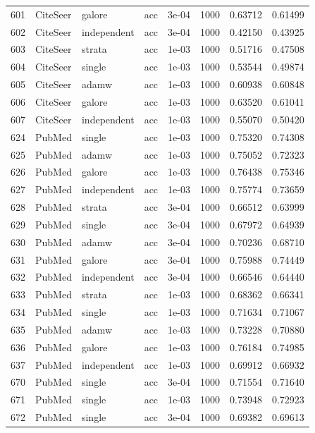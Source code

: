 \begin{longtable}{rlllrrrr}
601 & CiteSeer & galore & acc & 3e-04 & 1000 & 0.63712 & 0.61499 \\
602 & CiteSeer & independent & acc & 3e-04 & 1000 & 0.42150 & 0.43925 \\
\rowcolor{oursbg}
603 & CiteSeer & strata & acc & 1e-03 & 1000 & 0.51716 & 0.47508 \\
604 & CiteSeer & single & acc & 1e-03 & 1000 & 0.53544 & 0.49874 \\
605 & CiteSeer & adamw & acc & 1e-03 & 1000 & 0.60938 & 0.60848 \\
606 & CiteSeer & galore & acc & 1e-03 & 1000 & 0.63520 & 0.61041 \\
607 & CiteSeer & independent & acc & 1e-03 & 1000 & 0.55070 & 0.50420 \\
624 & PubMed & single & acc & 1e-03 & 1000 & 0.75320 & 0.74308 \\
625 & PubMed & adamw & acc & 1e-03 & 1000 & 0.75052 & 0.72323 \\
626 & PubMed & galore & acc & 1e-03 & 1000 & 0.76438 & 0.75346 \\
627 & PubMed & independent & acc & 1e-03 & 1000 & 0.75774 & 0.73659 \\
\rowcolor{oursbg}
628 & PubMed & strata & acc & 3e-04 & 1000 & 0.66512 & 0.63999 \\
629 & PubMed & single & acc & 3e-04 & 1000 & 0.67972 & 0.64939 \\
630 & PubMed & adamw & acc & 3e-04 & 1000 & 0.70236 & 0.68710 \\
631 & PubMed & galore & acc & 3e-04 & 1000 & 0.75988 & 0.74449 \\
632 & PubMed & independent & acc & 3e-04 & 1000 & 0.66546 & 0.64440 \\
\rowcolor{oursbg}
633 & PubMed & strata & acc & 1e-03 & 1000 & 0.68362 & 0.66341 \\
634 & PubMed & single & acc & 1e-03 & 1000 & 0.71634 & 0.71067 \\
635 & PubMed & adamw & acc & 1e-03 & 1000 & 0.73228 & 0.70880 \\
636 & PubMed & galore & acc & 1e-03 & 1000 & 0.76184 & 0.74985 \\
637 & PubMed & independent & acc & 1e-03 & 1000 & 0.69912 & 0.66932 \\
670 & PubMed & single & acc & 3e-04 & 1000 & 0.71554 & 0.71640 \\
671 & PubMed & single & acc & 1e-03 & 1000 & 0.73948 & 0.72923 \\
672 & PubMed & single & acc & 3e-04 & 1000 & 0.69382 & 0.69613 \\

\end{longtable}
